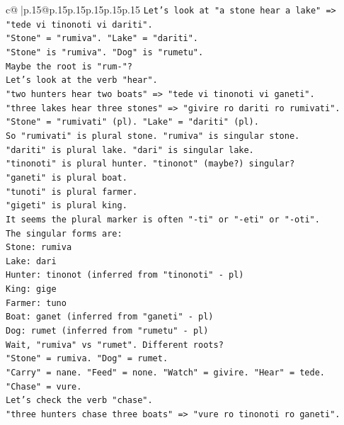 \documentclass{article}
\begin{document}
{\begin{supertabular}{c@{$\;$}|p{.15\linewidth}@{}p{.15\linewidth}p{.15\linewidth}p{.15\linewidth}p{.15\linewidth}p{.15\linewidth}}
{{{\texttt{Let's look at "a stone hear a lake" => "tede vi tinonoti vi dariti".} \\
\texttt{"Stone" = "rumiva". "Lake" = "dariti".} \\
\texttt{"Stone" is "rumiva". "Dog" is "rumetu".} \\
\texttt{Maybe the root is "rum{-}"?} \\
\texttt{Let's look at the verb "hear".} \\
\texttt{"two hunters hear two boats" => "tede vi tinonoti vi ganeti".} \\
\texttt{"three lakes hear three stones" => "givire ro dariti ro rumivati".} \\
\texttt{"Stone" = "rumivati" (pl). "Lake" = "dariti" (pl).} \\
\texttt{So "rumivati" is plural stone. "rumiva" is singular stone.} \\
\texttt{"dariti" is plural lake. "dari" is singular lake.} \\
\texttt{"tinonoti" is plural hunter. "tinonot" (maybe?) singular?} \\
\texttt{"ganeti" is plural boat.} \\
\texttt{"tunoti" is plural farmer.} \\
\texttt{"gigeti" is plural king.} \\
\texttt{It seems the plural marker is often "{-}ti" or "{-}eti" or "{-}oti".} \\
\texttt{The singular forms are:} \\
\texttt{Stone: rumiva} \\
\texttt{Lake: dari} \\
\texttt{Hunter: tinonot (inferred from "tinonoti" {-} pl)} \\
\texttt{King: gige} \\
\texttt{Farmer: tuno} \\
\texttt{Boat: ganet (inferred from "ganeti" {-} pl)} \\
\texttt{Dog: rumet (inferred from "rumetu" {-} pl)} \\
\texttt{Wait, "rumiva" vs "rumet". Different roots?} \\
\texttt{"Stone" = rumiva. "Dog" = rumet.} \\
\texttt{"Carry" = nane. "Feed" = none. "Watch" = givire. "Hear" = tede. "Chase" = vure.} \\
\texttt{Let's check the verb "chase".} \\
\texttt{"three hunters chase three boats" => "vure ro tinonoti ro ganeti".} \\
}}}
\end{supertabular}}
\end{document}
